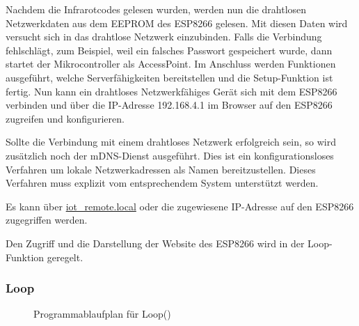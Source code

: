 Nachdem die Infrarotcodes gelesen wurden, werden nun die drahtlosen Netzwerkdaten aus dem \acs{EEPROM} des ESP8266 gelesen.
Mit diesen Daten wird versucht sich in das drahtlose Netzwerk einzubinden.
Falls die Verbindung fehlschlägt, zum Beispiel, weil ein falsches Passwort gespeichert wurde, dann startet der Mikrocontroller als AccessPoint.
Im Anschluss werden Funktionen ausgeführt, welche Serverfähigkeiten bereitstellen und die Setup-Funktion ist fertig.
Nun kann ein drahtloses Netzwerkfähiges Gerät sich mit dem ESP8266 verbinden und über die IP-Adresse 192.168.4.1 im Browser auf den ESP8266 zugreifen und konfigurieren.

Sollte die Verbindung mit einem drahtloses Netzwerk erfolgreich sein, so wird zusätzlich noch der \acs{mDNS}-Dienst ausgeführt.
Dies ist ein konfigurationsloses Verfahren um lokale Netzwerkadressen als Namen bereitzustellen.
Dieses Verfahren muss explizit vom entsprechendem System unterstützt werden.

Es kann über \url{iot_remote.local} oder die zugewiesene IP-Adresse auf den ESP8266 zugegriffen werden.

Den Zugriff und die Darstellung der Website des ESP8266 wird in der Loop-Funktion geregelt.
\subsubsection{Loop}
\begin{figure}[!ht]
\centering 
{}
\caption{Programmablaufplan für Loop()}
\label{PAP:Loop}
\end{figure}

